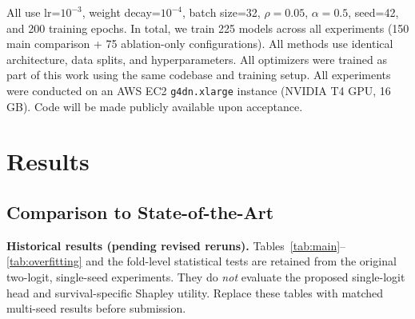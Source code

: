 \documentclass[runningheads]{llncs}
\begin{document}
All use lr=$10^{-3}$, weight decay=$10^{-4}$, batch size=32,
$\rho=0.05$, $\alpha=0.5$, seed=42, and 200 training epochs.
In total, we train 225 models across all experiments
(150 main comparison + 75 ablation-only configurations).
All methods use identical architecture, data splits, and
hyperparameters. All optimizers were trained as part of this work using
the same codebase and training setup.
All experiments were conducted on an AWS EC2 \texttt{g4dn.xlarge}
instance (NVIDIA T4 GPU, 16\,GB). Code will be made publicly available upon acceptance.

\section{Results}

\subsection{Comparison to State-of-the-Art}

\noindent\textbf{Historical results (pending revised reruns).}
Tables~\ref{tab:main}--\ref{tab:overfitting} and the fold-level
statistical tests are retained from the original two-logit,
single-seed experiments. They do \emph{not} evaluate the proposed
single-logit head and survival-specific Shapley utility. Replace
these tables with matched multi-seed results before submission.
\end{document}
